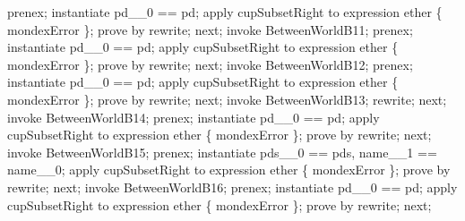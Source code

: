 \begin{LPScript}
\begin{zproof}[lPromotedBetweenWorldAbortType]
            prenex;
            instantiate pd\_\_0 == pd;
            apply cupSubsetRight to expression ether \cup \{ mondexError \};
            prove by rewrite;
        next;
            invoke BetweenWorldB11;
            prenex;
            instantiate pd\_\_0 == pd;
            apply cupSubsetRight to expression ether \cup \{ mondexError \};
            prove by rewrite;
        next;
            invoke BetweenWorldB12;
            prenex;
            instantiate pd\_\_0 == pd;
            apply cupSubsetRight to expression ether \cup \{ mondexError \};
            prove by rewrite;
        next;
            invoke BetweenWorldB13;
            rewrite;
        next;
            invoke BetweenWorldB14;
            prenex;
            instantiate pd\_\_0 == pd;
            apply cupSubsetRight to expression ether \cup \{ mondexError \};
            prove by rewrite;
        next;
            invoke BetweenWorldB15;
            prenex;
            instantiate pds\_\_0 == pds, name\_\_1 == name\_\_0;
            apply cupSubsetRight to expression ether \cup \{ mondexError \};
            prove by rewrite;
        next;
            invoke BetweenWorldB16;
            prenex;
            instantiate pd\_\_0 == pd;
            apply cupSubsetRight to expression ether \cup \{ mondexError \};
            prove by rewrite;
    next;
\end{zproof}\end{LPScript}

